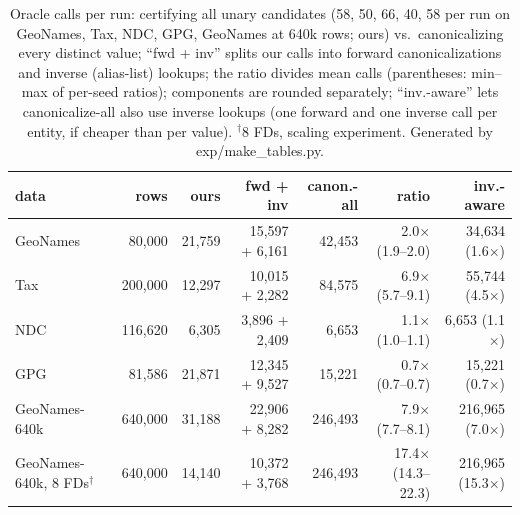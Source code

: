 \begin{table}[t]\centering\small\caption{Oracle calls per run: certifying all unary candidates (58, 50, 66, 40, 58 per run on GeoNames, Tax, NDC, GPG, GeoNames at 640k rows; ours) vs.\ canonicalizing every distinct value; ``fwd + inv'' splits our calls into forward canonicalizations and inverse (alias-list) lookups; the ratio divides mean calls (parentheses: min--max of per-seed ratios); components are rounded separately; ``inv.-aware'' lets canonicalize-all also use inverse lookups (one forward and one inverse call per entity, if cheaper than per value). $^\dagger$8 FDs, scaling experiment. Generated by exp/make\_tables.py.}\label{tab:cost}
\setlength{\tabcolsep}{6pt}\begin{tabular}{lrrrrrr}\toprule
data & rows & ours & fwd + inv & canon.-all & ratio & inv.-aware \\\midrule
GeoNames & 80,000 & 21,759 & 15,597 + 6,161 & 42,453 & 2.0$\times$ (1.9--2.0) & 34,634 (1.6$\times$) \\
Tax & 200,000 & 12,297 & 10,015 + 2,282 & 84,575 & 6.9$\times$ (5.7--9.1) & 55,744 (4.5$\times$) \\
NDC & 116,620 & 6,305 & 3,896 + 2,409 & 6,653 & 1.1$\times$ (1.0--1.1) & 6,653 (1.1$\times$) \\
GPG & 81,586 & 21,871 & 12,345 + 9,527 & 15,221 & 0.7$\times$ (0.7--0.7) & 15,221 (0.7$\times$) \\
GeoNames-640k & 640,000 & 31,188 & 22,906 + 8,282 & 246,493 & 7.9$\times$ (7.7--8.1) & 216,965 (7.0$\times$) \\
GeoNames-640k, 8 FDs$^\dagger$ & 640,000 & 14,140 & 10,372 + 3,768 & 246,493 & 17.4$\times$ (14.3--22.3) & 216,965 (15.3$\times$) \\
\bottomrule\end{tabular}\end{table}
